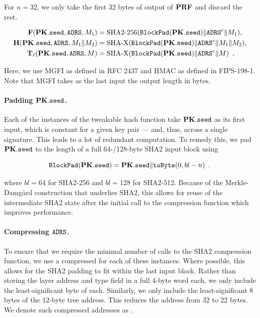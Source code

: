 For $n=32$, we only take the first 32 bytes of output of $\mathbf{PRF}$ and discard the rest.   

\begin{align*}
    \mathbf{F}(\mathbf{PK}.\mathtt{seed}, \mathtt{ADRS}, M_1) &= \text{SHA2-256}(\mathtt{BlockPad}(\mathbf{PK}.\mathtt{seed}) \| \mathtt{ADRS}^c \| M_{1} ), \\
    \mathbf{H}(\mathbf{PK}.\mathtt{seed}, \mathtt{ADRS}, M_1 \| M_2) &= \text{SHA-X}(\mathtt{BlockPad}(\mathbf{PK}.\mathtt{seed}) \| \mathtt{ADRS}^c \| M_1 \| M_2 ), \\
    \mathbf{T}_\ell (\mathbf{PK}.\mathtt{seed}, \mathtt{ADRS}, M) &= \text{SHA-X}(\mathtt{BlockPad}(\mathbf{PK}.\mathtt{seed}) \| \mathtt{ADRS}^c \| M) \enspace,
\end{align*}

Here, we use MGFI as defined in RFC 2437 and HMAC as defined in FIPS-198-1. Note that MGFI takes as the last input the output length in bytes.
 

\paragraph{Padding $\mathbf{PK}.\mathtt{seed}$.} 
Each of the instances of the tweakable hash function take $\mathbf{PK}.\mathtt{seed}$ as its first input, which is constant for a given key pair --- and, thus, across a single signature. This leads to a lot of redundant computation. To remedy this, we pad $\mathbf{PK}.\mathtt{seed}$ to the length of a full 64-/128-byte SHA2 input block using

\[ 
    \mathtt{BlockPad}(\mathbf{PK}.\mathtt{seed}) =\mathbf{PK}.\mathtt{seed} \| \mathtt{toByte} (0, bl-n) \enspace.
\]

where $bl=64$ for SHA2-256 and $bl=128$ for SHA2-512. Because of the Merkle-Damgård construction that underlies SHA2, this allows for reuse of the intermediate SHA2 state after the initial call to the compression function which improves performance.

\paragraph{Compressing $\mathtt{ADRS}$.} 
To ensure that we require the minimal number of calls to the SHA2 compression function, we use a compressed \ADRS for each of these instances. Where possible, this allows for the SHA2 padding to fit within the last input block. Rather than storing the layer address and type field in a full 4-byte word each, we only include the least-significant byte of each. Similarly, we only include the least-significant 8 bytes of the 12-byte tree address. This reduces the address from 32 to 22 bytes. We denote such compressed addresses as \ADRS.

